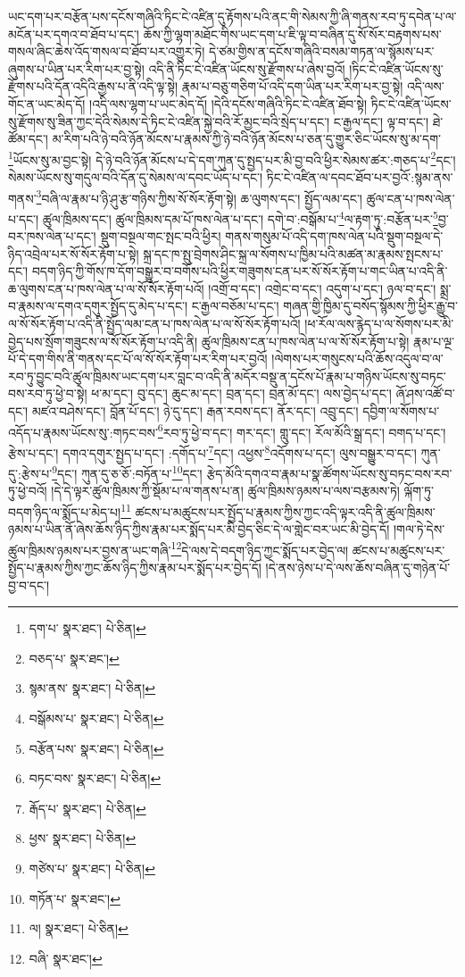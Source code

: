 ཡང་དག་པར་བརྩོན་པས་དངོས་གཞིའི་ཏིང་ངེ་འཛིན་དུ་རྟོགས་པའི་ནང་གི་སེམས་ཀྱི་ཞི་གནས་རབ་ཏུ་དབེན་པ་ལ་མངོན་པར་དགའ་བ་ཐོབ་པ་དང་། ཆོས་ཀྱི་ལྷག་མཐོང་གིས་ཡང་དག་པ་ཇི་ལྟ་བ་བཞིན་དུ་སོ་སོར་བརྟགས་པས་གསལ་ཞིང་ཆེས་འོད་གསལ་བ་ཐོབ་པར་འགྱུར་ཏེ། དེ་ཙམ་གྱིས་ན་དངོས་གཞིའི་བསམ་གཏན་ལ་སྙོམས་པར་ཞུགས་པ་ཡིན་པར་རིག་པར་བྱ་སྟེ། འདི་ནི་ཏིང་ངེ་འཛིན་ཡོངས་སུ་རྫོགས་པ་ཞེས་བྱའོ། །ཏིང་ངེ་འཛིན་ཡོངས་སུ་རྫོགས་པའི་དོན་འདིའི་རྒྱས་པ་ནི་འདི་ལྟ་སྟེ། རྣམ་པ་བཅུ་གཅིག་པོ་འདི་དག་ཡིན་པར་རིག་པར་བྱ་སྟེ། འདི་ལས་གོང་ན་ཡང་མེད་དོ། །འདི་ལས་ལྷག་པ་ཡང་མེད་དོ། །དེའི་དངོས་གཞིའི་ཏིང་ངེ་འཛིན་ཐོབ་སྟེ། ཏིང་ངེ་འཛིན་ཡོངས་སུ་རྫོགས་སུ་ཟིན་ཀྱང་དེའི་སེམས་དེ་ཏིང་ངེ་འཛིན་སྐྱེ་བའི་རོ་མྱང་བའི་སྲེད་པ་དང་། ང་རྒྱལ་དང་། ལྟ་བ་དང་། ཐེ་ཚོམ་དང་། མ་རིག་པའི་ཉེ་བའི་ཉོན་མོངས་པ་རྣམས་ཀྱི་ཉེ་བའི་ཉོན་མོངས་པ་ཅན་དུ་གྱུར་ཅིང་ཡོངས་སུ་མ་དག་\footnote{དག་པ་  སྣར་ཐང་།  པེ་ཅིན། }ཡོངས་སུ་མ་བྱང་སྟེ། དེ་ཉེ་བའི་ཉོན་མོངས་པ་དེ་དག་ཀུན་དུ་སྤྱད་པར་མི་བྱ་བའི་ཕྱིར་སེམས་ཚར་:གཅད་པ་\footnote{བཅད་པ་  སྣར་ཐང་། }དང་། སེམས་ཡོངས་སུ་གདུལ་བའི་དོན་དུ་སེམས་ལ་དབང་ཡོད་པ་དང་། ཏིང་ངེ་འཛིན་ལ་དབང་ཐོབ་པར་བྱའོ་:སྙམ་ནས་གནས་\footnote{སྙམ་ནས་  སྣར་ཐང་།  པེ་ཅིན། }བཞི་ལ་རྣམ་པ་ཉི་ཤུ་རྩ་གཉིས་ཀྱིས་སོ་སོར་རྟོག་སྟེ། ཆ་ལུགས་དང་། སྤྱོད་ལམ་དང་། ཚུལ་ངན་པ་ཁས་ལེན་པ་དང་། ཚུལ་ཁྲིམས་དང་། ཚུལ་ཁྲིམས་དམ་པོ་ཁས་ལེན་པ་དང་། དགེ་བ་:བསྒོམ་པ་\footnote{བསྒོམས་པ་  སྣར་ཐང་།  པེ་ཅིན། }ལ་རྟག་ཏུ་:བརྩོན་པར་\footnote{བརྩོན་པས་  སྣར་ཐང་།  པེ་ཅིན། }བྱ་བར་ཁས་ལེན་པ་དང་། སྡུག་བསྔལ་གང་སྤང་བའི་ཕྱིར། གནས་གསུམ་པོ་འདི་དག་ཁས་ལེན་པའི་སྡུག་བསྔལ་དེ་ཉིད་འབྲེལ་པར་སོ་སོར་རྟོག་པ་སྟེ། སྐྲ་དང་ཁ་སྤུ་བྲེགས་ཤིང་སྐྲ་ལ་སོགས་པ་ཁྱིམ་པའི་མཚན་མ་རྣམས་སྤངས་པ་དང་། བདག་ཉིད་ཀྱི་གོས་ཁ་དོག་བསྒྱུར་བ་བགོས་པའི་ཕྱིར་གཟུགས་ངན་པར་སོ་སོར་རྟོག་པ་གང་ཡིན་པ་འདི་ནི་ཆ་ལུགས་ངན་པ་ཁས་ལེན་པ་ལ་སོ་སོར་རྟོག་པའོ། །འགྲོ་བ་དང་། འགྲེང་བ་དང་། འདུག་པ་དང་། ཉལ་བ་དང་། སྨྲ་བ་རྣམས་ལ་དགའ་དགུར་སྤྱོད་དུ་མེད་པ་དང་། ང་རྒྱལ་བཅོམ་པ་དང་། གཞན་གྱི་ཁྱིམ་དུ་བསོད་སྙོམས་ཀྱི་ཕྱིར་རྒྱུ་བ་ལ་སོ་སོར་རྟོག་པ་འདི་ནི་སྤྱོད་ལམ་ངན་པ་ཁས་ལེན་པ་ལ་སོ་སོར་རྟོག་པའོ། །ཕ་རོལ་ལས་རྙེད་པ་ལ་སོགས་པར་མི་བྱེད་པས་སྲོག་གཟུངས་ལ་སོ་སོར་རྟོག་པ་འདི་ནི། ཚུལ་ཁྲིམས་ངན་པ་ཁས་ལེན་པ་ལ་སོ་སོར་རྟོག་པ་སྟེ། རྣམ་པ་ལྔ་པོ་དེ་དག་གིས་ནི་གནས་དང་པོ་ལ་སོ་སོར་རྟོག་པར་རིག་པར་བྱའོ། །ལེགས་པར་གསུངས་པའི་ཆོས་འདུལ་བ་ལ་རབ་ཏུ་བྱུང་བའི་ཚུལ་ཁྲིམས་ཡང་དག་པར་བླང་བ་འདི་ནི་མདོར་བསྡུ་ན་དངོས་པོ་རྣམ་པ་གཉིས་ཡོངས་སུ་བཏང་བས་རབ་ཏུ་ཕྱེ་བ་སྟེ། ཕ་མ་དང་། བུ་དང་། ཆུང་མ་དང་། བྲན་དང་། བྲན་མོ་དང་། ལས་བྱེད་པ་དང་། ཞོ་ཤས་འཚོ་བ་དང་། མཛའ་བཤེས་དང་། བློན་པོ་དང་། ཉེ་དུ་དང་། རྒན་རབས་དང་། ནོར་དང་། འབྲུ་དང་། དབྱིག་ལ་སོགས་པ་འདོད་པ་རྣམས་ཡོངས་སུ་:གཏང་བས་\footnote{བཏང་བས་  སྣར་ཐང་།  པེ་ཅིན། }རབ་ཏུ་ཕྱེ་བ་དང་། གར་དང་། གླུ་དང་། རོལ་མོའི་སྒྲ་དང་། བགད་པ་དང་། རྩེས་པ་དང་། དགའ་དགུར་སྤྱད་པ་དང་། :དགོད་པ་\footnote{རྒོད་པ་  སྣར་ཐང་།  པེ་ཅིན། }དང་། འཕྱས་\footnote{ཕྱས་  སྣར་ཐང་།  པེ་ཅིན། }འདོགས་པ་དང་། ལུས་བསྒྱུར་བ་དང་། ཀུན་དུ་:རྩེས་པ་\footnote{གཙེས་པ་  སྣར་ཐང་།  པེ་ཅིན། }དང་། ཀུན་དུ་ཅ་ཅོ་:བཏོན་པ་\footnote{གཏོན་པ་  སྣར་ཐང་། }དང་། རྩེད་མོའི་དགའ་བ་རྣམ་པ་སྣ་ཚོགས་ཡོངས་སུ་བཏང་བས་རབ་ཏུ་ཕྱེ་བའོ། །དེ་དེ་ལྟར་ཚུལ་ཁྲིམས་ཀྱི་སྡོམ་པ་ལ་གནས་པ་ན། ཚུལ་ཁྲིམས་ཉམས་པ་ལས་བརྩམས་ཏེ། ལྐོག་ཏུ་བདག་ཉིད་ལ་སྨོད་པ་མེད་པ།\footnote{ལ།  སྣར་ཐང་།  པེ་ཅིན། } ཚངས་པ་མཚུངས་པར་སྤྱོད་པ་རྣམས་ཀྱིས་ཀྱང་འདི་ལྟར་འདི་ནི་ཚུལ་ཁྲིམས་ཉམས་པ་ཡིན་ནོ་ཞེས་ཆོས་ཉིད་ཀྱིས་རྣམ་པར་སྨོད་པར་མི་བྱེད་ཅིང་དེ་ལ་གླེང་བར་ཡང་མི་བྱེད་དོ། །གལ་ཏེ་དེས་ཚུལ་ཁྲིམས་ཉམས་པར་བྱས་ན་ཡང་གཞི་\footnote{བཞི་  སྣར་ཐང་། }དེ་ལས་དེ་བདག་ཉིད་ཀྱང་སྨོད་པར་བྱེད་ལ། ཚངས་པ་མཚུངས་པར་སྤྱོད་པ་རྣམས་ཀྱིས་ཀྱང་ཆོས་ཉིད་ཀྱིས་རྣམ་པར་སྨོད་པར་བྱེད་དོ། །དེ་ནས་ཉེས་པ་དེ་ལས་ཆོས་བཞིན་དུ་གཉེན་པོ་བྱ་བ་དང་། 